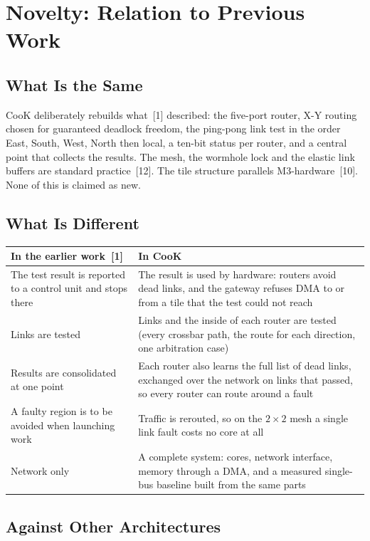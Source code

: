 \documentclass[11pt,a4paper]{article}
\begin{document}
\section{Novelty: Relation to Previous Work}

\subsection{What Is the Same}

CooK deliberately rebuilds what~[1] described: the five-port router, X-Y
routing chosen for guaranteed deadlock freedom, the ping-pong link test in the
order East, South, West, North then local, a ten-bit status per router, and a
central point that collects the results. The mesh, the wormhole lock and the
elastic link buffers are standard practice~[12]. The tile structure parallels
M3-hardware~[10]. None of this is claimed as new.

\subsection{What Is Different}

\begin{tabularx}{\textwidth}{@{}YY@{}}
\toprule
\textbf{In the earlier work~[1]} & \textbf{In CooK} \\
\midrule
The test result is reported to a control unit and stops there & The result
is used by hardware: routers avoid dead links, and the gateway refuses DMA to
or from a tile that the test could not reach \\
Links are tested & Links and the inside of each router are tested (every
crossbar path, the route for each direction, one arbitration case) \\
Results are consolidated at one point & Each router also learns the full list
of dead links, exchanged over the network on links that passed, so every
router can route around a fault \\
A faulty region is to be avoided when launching work & Traffic is rerouted,
so on the $2\times2$ mesh a single link fault costs no core at all \\
Network only & A complete system: cores, network interface, memory through a
DMA, and a measured single-bus baseline built from the same parts \\
\bottomrule
\end{tabularx}

\subsection{Against Other Architectures}
\end{document}

